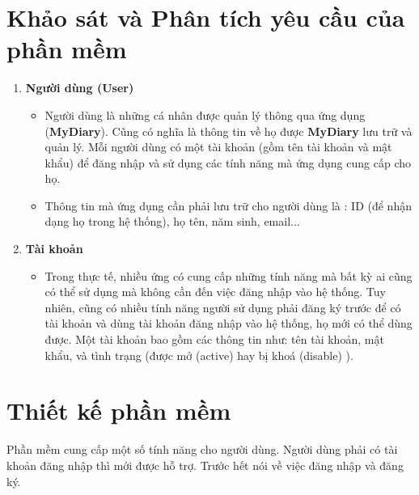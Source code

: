 \documentclass[a4paper]{article}
\begin{document}
\section{Khảo sát và Phân tích yêu cầu của phần mềm}

	\begin{enumerate}
		\item \textbf{Người dùng (User)}
		\begin{itemize}
			\item Người dùng là những cá nhân được quản lý thông qua ứng dụng (\textbf{MyDiary}). Cũng có nghĩa là thông tin về họ được \textbf{MyDiary} lưu trữ và quản lý. Mỗi người dùng có một tài khoản (gồm tên tài khoản và mật khẩu) để đăng nhập và sử dụng các tính năng mà ứng dụng cung cấp cho họ.
			\item Thông tin mà ứng dụng cần phải lưu trữ cho người dùng là : ID (để nhận dạng họ trong hệ thống), họ tên, năm sinh, email...
		\end{itemize}


		\item \textbf{Tài khoản}
			\begin{itemize}
				\item  Trong thực tế, nhiều ứng có cung cấp những tính năng mà bất kỳ ai cũng có thể sử dụng mà không cần đến việc đăng nhập vào hệ thống. Tuy nhiên, cũng có nhiều tính năng người sử dụng phải đăng ký trước để có tài khoản và dùng tài khoản đăng nhập vào hệ thống, họ mới có thể dùng được. Một tài khoản bao gồm các thông tin như: tên tài khoản, mật khẩu, và tình trạng (được mở (active) hay bị khoá (disable) ).
			\end{itemize}

	\end{enumerate}

\section{Thiết kế phần mềm}

	Phần mềm cung cấp một số tính năng cho người dùng. Người dùng phải có tài khoản đăng nhập thì mới được hỗ trợ. Trước hết nói về việc đăng nhập và đăng ký.
\end{document}
